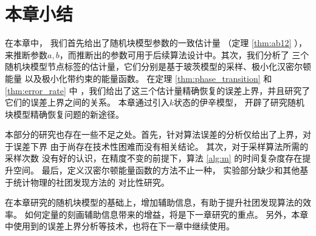 

\section{本章小结}\label{sec:summary_potts}
在本章中， 
我们首先给出了随机块模型参数的一致估计量 （定理 \ref{thm:ab12} ），
来推断参数$a,b$，而推断出的参数可用于后续算法设计中。其次，我们分析了
三个随机块模型节点标签的估计量，它们分别是基于玻茨模型的采样、极小化汉密尔顿能量
以及极小化带约束的能量函数。
在定理 \ref{thm:phase_transition} 和 \ref{thm:error_rate} 中
，我们给出了这三个估计量精确恢复的误差上界，并且研究了它们的误差上界之间的关系。
本章通过引入$k$状态的伊辛模型，
开辟了研究随机块模型精确恢复问题的新途径。

本部分的研究也存在一些不足之处。首先，针对算法误差的分析仅给出了上界，对于误差下界
由于尚存在技术性困难而没有相关结论。
其次，对于采样算法所需的采样次数
没有好的认识，在精度不变的前提下，算法 \ref{alg:m} 的时间复杂度存在提升空间。
最后，定义汉密尔顿能量函数的方法不止一种，
实验部分缺少和其他基于统计物理的社团发现方法的
对比性研究。

在本章研究的随机块模型的基础上，增加辅助信息，有助于提升社团发现算法的效率。
如何定量的刻画辅助信息带来的增益，将是下一章研究的重点。
另外，本章中使用到的误差上界分析等技术，也将在下一章中继续使用。


